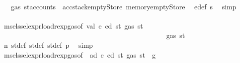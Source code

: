 \begin{isabellebody}
\ \ \ \ \ \ \ \ \ \ \ \ \ \ \ \ \ \ \ \ \ \ \ \ \ \ \ \ \ \ \ \ \ \ \ \ \ \ \ \ \ \ \ \ \isamarkupfalse%
\ {\isachardoublequoteopen}{\isasymdots}\ {\isasymle}\ gas\ {\isacharparenleft}{\kern0pt}st{\isacharprime}{\kern0pt}{\isacharprime}{\kern0pt}{\isacharprime}{\kern0pt}{\isasymlparr}accounts\ {\isacharcolon}{\kern0pt}{\isacharequal}{\kern0pt}\ acc{\isacharcomma}{\kern0pt}stack{\isacharcolon}{\kern0pt}{\isacharequal}{\kern0pt}emptyStore{\isacharcomma}{\kern0pt}\ memory{\isacharcolon}{\kern0pt}{\isacharequal}{\kern0pt}emptyStore{\isasymrparr}{\isacharparenright}{\kern0pt}{\isachardoublequoteclose}\ \isamarkupfalse%
\ e{\isacharprime}{\kern0pt}{\isacharunderscore}{\kern0pt}def\ s{}\ \isamarkupfalse%
\ simp\isanewline
\ \ \ \ \ \ \ \ \ \ \ \ \ \ \ \ \ \ \ \ \ \ \ \ \ \ \ \ \ \ \ \ \ \ \ \ \ \ \ \ \ \ \isamarkupfalse%
\ \isamarkupfalse%
\ msel{\isacharunderscore}{\kern0pt}ssel{\isacharunderscore}{\kern0pt}expr{\isacharunderscore}{\kern0pt}load{\isacharunderscore}{\kern0pt}rexp{\isacharunderscore}{\kern0pt}gas{\isacharparenleft}{\kern0pt}{}{\isacharparenright}{\kern0pt}{\isacharbrackleft}{\kern0pt}of\ val\ e\ cd\ st{\isacharprime}{\kern0pt}{\isacharprime}{\kern0pt}\ {\isachardoublequoteopen}gas\ st{\isacharprime}{\kern0pt}{\isacharprime}{\kern0pt}{\isachardoublequoteclose}{\isacharbrackright}{\kern0pt}\isanewline
\ \ \ \ \ \ \ \ \ \ \ \ \ \ \ \ \ \ \ \ \ \ \ \ \ \ \ \ \ \ \ \ \ \ \ \ \ \ \ \ \ \ \ \ \isamarkupfalse%
\ {\isachardoublequoteopen}{\isasymdots}\ {\isasymle}\ gas\ st{\isacharprime}{\kern0pt}{\isacharprime}{\kern0pt}{\isachardoublequoteclose}\ \isamarkupfalse%
\ n{}\ st{\isacharprime}{\kern0pt}{\isacharunderscore}{\kern0pt}def\ st{\isacharprime}{\kern0pt}{\isacharprime}{\kern0pt}{\isacharunderscore}{\kern0pt}def\ st{\isacharprime}{\kern0pt}{\isacharprime}{\kern0pt}{\isacharprime}{\kern0pt}{\isacharunderscore}{\kern0pt}def\ p{}\ \isamarkupfalse%
\ simp\isanewline
\ \ \ \ \ \ \ \ \ \ \ \ \ \ \ \ \ \ \ \ \ \ \ \ \ \ \ \ \ \ \ \ \ \ \ \ \ \ \ \ \ \ \isamarkupfalse%
\ \isamarkupfalse%
\ msel{\isacharunderscore}{\kern0pt}ssel{\isacharunderscore}{\kern0pt}expr{\isacharunderscore}{\kern0pt}load{\isacharunderscore}{\kern0pt}rexp{\isacharunderscore}{\kern0pt}gas{\isacharparenleft}{\kern0pt}{}{\isacharparenright}{\kern0pt}{\isacharbrackleft}{\kern0pt}of\ \ ad\ e\ cd\ st{\isacharprime}{\kern0pt}\ {\isachardoublequoteopen}gas\ st\ {\isacharminus}{\kern0pt}\ g{\isachardoublequoteclose}{\isacharbrackright}{\kern0pt}\isanewline

\end{isabellebody}
